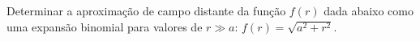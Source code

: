 Determinar a aproximação de campo distante da função $f(r)$ dada abaixo como uma expansão binomial para valores de $r \gg a$: $f(r) = \sqrt{a^2 + r^2}$.

